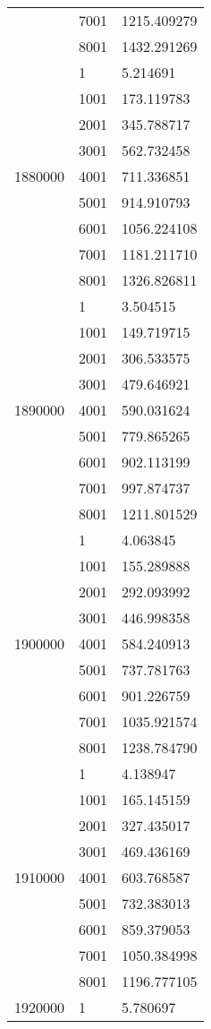\begin{table}[htb!]
\begin{tabular}{lll}
 & 7001 & 1215.409279 \\
 & 8001 & 1432.291269 \\
\multirow[c]{9}{*}{1880000} & 1 & 5.214691 \\
 & 1001 & 173.119783 \\
 & 2001 & 345.788717 \\
 & 3001 & 562.732458 \\
 & 4001 & 711.336851 \\
 & 5001 & 914.910793 \\
 & 6001 & 1056.224108 \\
 & 7001 & 1181.211710 \\
 & 8001 & 1326.826811 \\
\multirow[c]{9}{*}{1890000} & 1 & 3.504515 \\
 & 1001 & 149.719715 \\
 & 2001 & 306.533575 \\
 & 3001 & 479.646921 \\
 & 4001 & 590.031624 \\
 & 5001 & 779.865265 \\
 & 6001 & 902.113199 \\
 & 7001 & 997.874737 \\
 & 8001 & 1211.801529 \\
\multirow[c]{9}{*}{1900000} & 1 & 4.063845 \\
 & 1001 & 155.289888 \\
 & 2001 & 292.093992 \\
 & 3001 & 446.998358 \\
 & 4001 & 584.240913 \\
 & 5001 & 737.781763 \\
 & 6001 & 901.226759 \\
 & 7001 & 1035.921574 \\
 & 8001 & 1238.784790 \\
\multirow[c]{9}{*}{1910000} & 1 & 4.138947 \\
 & 1001 & 165.145159 \\
 & 2001 & 327.435017 \\
 & 3001 & 469.436169 \\
 & 4001 & 603.768587 \\
 & 5001 & 732.383013 \\
 & 6001 & 859.379053 \\
 & 7001 & 1050.384998 \\
 & 8001 & 1196.777105 \\
\multirow[c]{9}{*}{1920000} & 1 & 5.780697 \\

\end{tabular}
\end{table}
